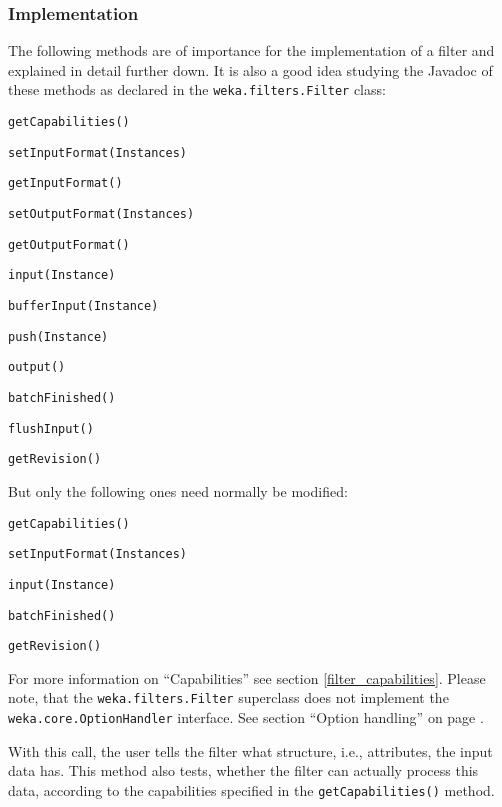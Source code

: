 \subsubsection{Implementation}
The following methods are of importance for the implementation of a filter and
explained in detail further down. It is also a good idea studying the Javadoc
of these methods as declared in the \texttt{weka.filters.Filter} class:
\begin{tight_itemize}
  \item \texttt{getCapabilities()}
  \item \texttt{setInputFormat(Instances)}
  \item \texttt{getInputFormat()}
  \item \texttt{setOutputFormat(Instances)}
  \item \texttt{getOutputFormat()}
  \item \texttt{input(Instance)}
  \item \texttt{bufferInput(Instance)}
  \item \texttt{push(Instance)}
  \item \texttt{output()}
  \item \texttt{batchFinished()}
  \item \texttt{flushInput()}
  \item \texttt{getRevision()}
\end{tight_itemize}
But only the following ones need normally be modified:
\begin{tight_itemize}
  \item \texttt{getCapabilities()}
  \item \texttt{setInputFormat(Instances)}
  \item \texttt{input(Instance)}
  \item \texttt{batchFinished()}
  \item \texttt{getRevision()}
\end{tight_itemize}
For more information on ``Capabilities'' see section \ref{filter_capabilities}.
Please note, that the \texttt{weka.filters.Filter} superclass does not
implement the \texttt{weka.core.OptionHandler} interface. See section ``Option
handling'' on page \pageref{filter_optionhandling}.

\newpage
{}
With this call, the user tells the filter what structure, i.e., attributes, the
input data has. This method also tests, whether the filter can actually process
this data, according to the capabilities specified in the
\texttt{getCapabilities()} method.

